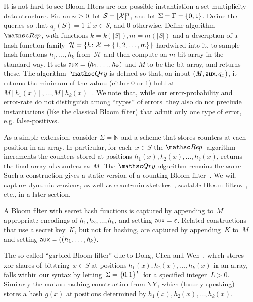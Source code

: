 
It is not hard to see Bloom filters are one possible instantiation a set-multiplicity data structure.
Fix an $n \geq 0$, let $\mathcal{S}=[{\cal X}]^n$, and let $\Sigma=\Gamma=\{0,1\}$.  
Define the queries so that $q_x(S)=1$ if $x \in S$, and 0 otherwise.  Define algorithm~$\Rep$, with functions $k=k(|S|), m=m(|S|)$ and a description of a hash function family~$\mathcal{H}=\{h \colon {\cal X} \to \{1,2,\ldots,m\}\}$ hardwired into it, to sample hash functions $h_1, \ldots, h_k$ from~$\mathcal{H}$ and then compute an $m$-bit array in the standard way.  It sets ${\sf aux} = (h_1, \ldots, h_k)$ and $M$ to be the bit array, and returns these.  The algorithm~$\Qry$ is defined so that, on input $(M,{\sf aux},q_x)$, it returns the minimum of the values (either 0 or 1) held at $M[h_1(x)],\ldots,M[h_k(x)]$.  We note that, while our error-probability and error-rate do not distinguish among ``types'' of errors, they also do not preclude instantiations (like the classical Bloom filter) that admit only one type of error, e.g. false-positives.  

As a simple extension, consider $\Sigma=\mathbb{N}$ and a scheme that stores counters at each position in an array.  In particular, for each~$x \in S$ the $\Rep$~algorithm increments the counters stored at positions $h_1(x), h_2(x), \ldots, h_k(x)$, returns the final array of counters as~$M$.  The $\Qry$-algorithm remains the same. Such a construction gives a static version of a counting Bloom filter~\cite{xxx}.  We will capture dynamic versions, as well as count-min sketches~\cite{xxx}, scalable Bloom filters~\cite{xxx}, etc., in a later section.

A Bloom filter with secret hash functions is captured by appending to~$M$ appropriate encodings of $h_1,h_2,\ldots,h_k$, and setting ${\sf aux}=\varepsilon$.  Related constructions  that use a secret key~$K$, but not for hashing, are captured by appending~$K$ to~$M$ and setting ${\sf aux}=((h_1, \ldots, h_k)$.

The so-called ``garbled Bloom filter'' due to Dong, Chen and Wen~\cite{xxx}, which stores xor-shares of bitstring~$x \in S$ at positions $h_1(x),h_2(x),\ldots,h_k(x)$ in an array, falls within our syntax by letting~$\Sigma=\{0,1\}^L$ for a specified integer~$L>0$.  Similarly the cuckoo-hashing construction from NY, which (loosely speaking) stores a hash $g(x)$ at positions determined by $h_1(x),h_2(x),\ldots,h_k(x)$.   



